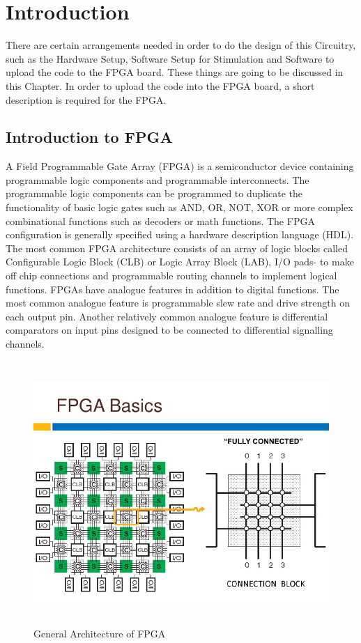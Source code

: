 \documentclass[12pt,a4paper]{article}
\begin{document}
\fancyfoot{}
\rfoot{\thepage}
\setcounter{page}{1}
\renewcommand{\baselinestretch}{1.5} %
\section{Introduction}
There are certain arrangements needed in order to do the design of this Circuitry, such as the Hardware Setup, Software Setup for Stimulation and Software to upload the code to the FPGA board. These things are going to be discussed in this Chapter. In order to upload the code into the FPGA board, a short description is required for the FPGA.\

\subsection{Introduction to FPGA }
A Field Programmable Gate Array (FPGA) is a semiconductor device containing programmable logic components and programmable interconnects. The programmable logic components can be programmed to duplicate the functionality of basic logic gates such as AND, OR, NOT, XOR or more complex combinational functions such as decoders or math functions. The FPGA configuration is generally specified using a hardware description language (HDL). The most common FPGA architecture consists of an array of logic blocks called Configurable Logic Block (CLB) or Logic Array Block (LAB), I/O pads- to make off chip connections and programmable routing channels to implement logical functions. FPGAs have analogue features in addition to digital functions. The most common analogue feature is programmable slew rate and drive strength on each output pin. Another relatively common analogue feature is differential comparators on input pins designed to be connected to differential signalling channels.\\

\begin{figure}[H]
\centering
\includegraphics[height=10cm,width=11.5cm]{FPGA.jpg}
\caption{General Architecture of FPGA}
\label{General Architecture of FPGA}
\end{figure}
\end{document}

